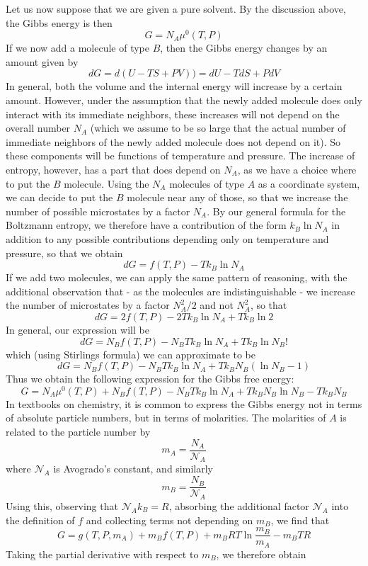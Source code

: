 \documentclass[a4paper, draft]{article}
\theoremstyle{own}
\theoremstyle{remark}
\begin{document}
Let us now suppose that we are given a pure solvent. By the discussion above, the Gibbs energy is then
$$
G = N_A \mu^0 (T, P)
$$
If we now add a molecule of type $B$, then the Gibbs energy changes by an amount given by 
$$
dG = d(U - TS + PV) ) = dU - T dS + P dV
$$
In general, both the volume and the internal energy will increase by a certain amount. However, under the assumption that the newly added molecule does only interact with its immediate neighbors, these increases will not depend on the overall number $N_A$ (which we assume to be so large that the actual number of immediate neighbors of the newly added molecule does not depend on it). So these components will be functions of temperature and pressure. The increase of entropy, however, has a part that does depend on $N_A$, as we have a choice where to put the $B$ molecule. Using the $N_A$ molecules of type $A$ as a coordinate system, we can decide to put the $B$ molecule near any of those, so that we increase the number of possible microstates by a factor $N_A$. By our general formula for the Boltzmann entropy, we therefore have a contribution of the form $k_B \ln N_A$ in addition to any possible contributions depending only on temperature and pressure, so that we obtain
$$
dG = f(T, P) - T k_B \ln N_A
$$
If we add two molecules, we can apply the same pattern of reasoning, with the additional observation that - as the molecules are indistinguishable - we increase the number of microstates by a factor $N_A^2 / 2$ and not $N_A^2$, so that
$$
dG = 2 f(T, P) - 2 T k_B \ln N_A + T k_B \ln 2
$$
In general, our expression will be
$$
dG = N_B f(T, P) - N_B T k_B \ln N_A + T k_B \ln N_B!
$$
which (using Stirlings formula) we can approximate to be
$$
dG = N_B f(T, P) - N_B T k_B \ln N_A + T k_B N_B (\ln N_B - 1)
$$
Thus we obtain the following expression for the Gibbs free energy:
$$
G = N_A \mu^0 (T, P) + N_B f(T, P) - N_B T k_B \ln N_A + T k_B N_B \ln N_B - T k_B N_B
$$
In textbooks on chemistry, it is common to express the Gibbs energy not in terms of absolute particle numbers, but in terms of molarities. The molarities of $A$ is related to the particle number by
$$
m_A = \frac{N_A}{\mathcal{N}_A}
$$
where $\mathcal{N}_A$ is Avogrado's constant, and similarly
$$
m_B = \frac{N_B}{\mathcal{N}_A}
$$
Using this, observing that $\mathcal{N}_A k_B = R$, absorbing the additional factor $\mathcal{N}_A$ into the definition of $f$ and collecting terms not depending on $m_B$, we find that 
$$
G = g(T, P, m_A ) +  m_B f(T, P) +  m_B RT \ln \frac{m_B}{m_A} - m_B T R 
$$
Taking the partial derivative with respect to $m_B$, we therefore obtain
\end{document}
